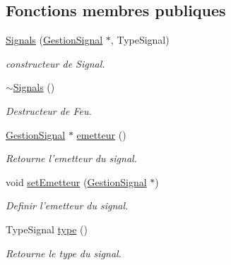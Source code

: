 \subsection*{Fonctions membres publiques}
\begin{DoxyCompactItemize}
\item 
\hypertarget{classSignals_abb20260e11bbaf3cdfc45cbc6506349a}{
\hyperlink{classSignals_abb20260e11bbaf3cdfc45cbc6506349a}{Signals} (\hyperlink{classGestionSignal}{GestionSignal} $\ast$, TypeSignal)}
\label{classSignals_abb20260e11bbaf3cdfc45cbc6506349a}

\begin{DoxyCompactList}\small\item\em constructeur de Signal. \item\end{DoxyCompactList}\item 
\hypertarget{classSignals_a023cdc52c51b2d8c33e0af2714b4cb04}{
\hyperlink{classSignals_a023cdc52c51b2d8c33e0af2714b4cb04}{$\sim$Signals} ()}
\label{classSignals_a023cdc52c51b2d8c33e0af2714b4cb04}

\begin{DoxyCompactList}\small\item\em Destructeur de Feu. \item\end{DoxyCompactList}\item 
\hyperlink{classGestionSignal}{GestionSignal} $\ast$ \hyperlink{classSignals_abd873414eef1e8deb5dc8bcae33aa8fe}{emetteur} ()
\begin{DoxyCompactList}\small\item\em Retourne l'emetteur du signal. \item\end{DoxyCompactList}\item 
void \hyperlink{classSignals_a8a58cb7d36939d77e0319e47e787f262}{setEmetteur} (\hyperlink{classGestionSignal}{GestionSignal} $\ast$)
\begin{DoxyCompactList}\small\item\em Definir l'emetteur du signal. \item\end{DoxyCompactList}\item 
TypeSignal \hyperlink{classSignals_af14716654fb552b8940935694edc1b69}{type} ()
\begin{DoxyCompactList}\small\item\em Retourne le type du signal. \item\end{DoxyCompactList}\end{DoxyCompactItemize}


